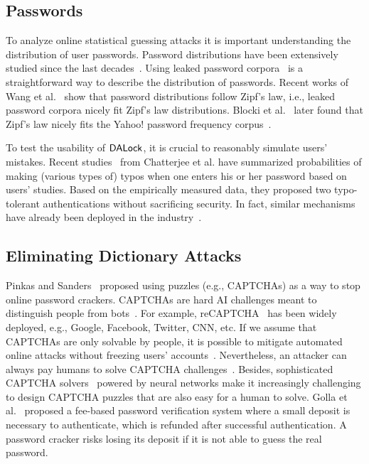 \subsection{Passwords} \label{related: Passwords}  

 To analyze online statistical guessing attacks it is important understanding the distribution of user passwords. Password distributions have been extensively studied since the last decades~\cite{FloHer:WWW07,DavKev:WWW12}. Using leaked password corpora~\cite{SP:Bonneau12,Dataset:RockYou} is a straightforward way to describe the distribution of passwords. Recent works of Wang et al.~\cite{EPRINT:WJHW14,TIFS17:WCWPXG,ESORICS:WanWan16} show that password distributions follow Zipf's law, i.e., leaked password corpora nicely fit Zipf's law distributions. Blocki et al.~\cite{SP:BloHarZho18} later found that Zipf's law nicely fits the Yahoo! password frequency corpus~\cite{SP:Bonneau12,NDSS:BloDatBon16}. 

  To test the usability of $\mathsf{DALock}$, it is crucial to reasonably simulate users' mistakes. Recent studies~\cite{CCS:CWPCR17,SP:CAAJR16} from Chatterjee et al. have summarized probabilities of making (various types of) typos when one enters his or her password based on users' studies. Based on the empirically measured data, they proposed two typo-tolerant authentications without sacrificing security. In fact, similar mechanisms have already been deployed in the industry~\cite{News:AmazonTypo}. 

\vspace{-0.2in}
\subsection{Eliminating Dictionary Attacks} 


 Pinkas and Sanders~\cite{CCS:PinSan02} proposed using puzzles (e.g., CAPTCHAs) as a way to stop online password crackers. CAPTCHAs are hard AI challenges meant to distinguish people from bots~\cite{EC:vBHL03}. For example, reCAPTCHA~\cite{von2008recaptcha} has been widely deployed, e.g., Google, Facebook, Twitter, CNN, etc. If we assume that CAPTCHAs are only solvable by people, it is possible to mitigate automated online attacks without freezing users' accounts~\cite{SP:BBFNJ10,CCS:BurMarMit11}. Nevertheless, an attacker can always pay humans to solve CAPTCHA challenges~\cite{captchaSolver}. Besides, sophisticated CAPTCHA solvers~\cite{CCS:YTFZFX18} powered by neural networks make it increasingly challenging to design CAPTCHA puzzles that are also easy for a human to solve.  Golla et al.~\cite{SOUPS:GBD17} proposed a fee-based password verification system where a small deposit is necessary to authenticate, which is refunded after successful authentication. A password cracker risks losing its deposit if it is not able to guess the real password.  

